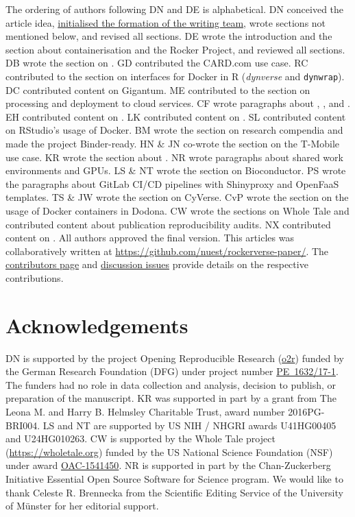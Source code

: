 The ordering of authors following DN and DE is alphabetical. DN
conceived the article idea,
\href{https://github.com/nuest/rockerverse-paper/issues/3}{initialised the formation of the writing team},
wrote sections not mentioned below, and revised all sections. DE wrote
the introduction and the section about containerisation and the Rocker
Project, and reviewed all sections. DB wrote the section on
. GD contributed the CARD.com use case. RC contributed to
the section on interfaces for Docker in R (\emph{dynverse} and
\texttt{dynwrap}). DC contributed content on Gigantum. ME contributed to
the section on processing and deployment to cloud services. CF wrote
paragraphs about , ,  and
. EH contributed content on . LK contributed
content on . SL contributed content on RStudio's usage of
Docker. BM wrote the section on research compendia and made the project
Binder-ready. HN \& JN co-wrote the section on the T-Mobile use case. KR
wrote the section about . NR wrote paragraphs about
shared work environments and GPUs. LS \& NT wrote the section on
Bioconductor. PS wrote the paragraphs about GitLab CI/CD pipelines with
Shinyproxy and OpenFaaS templates. TS \& JW wrote the section on
CyVerse. CvP wrote the section on the usage of Docker containers in
Dodona. CW wrote the sections on Whole Tale and contributed content
about publication reproducibility audits. NX contributed content on
. All authors approved the final version. This articles was
collaboratively written at
\href{https://github.com/nuest/rockerverse-paper/}{https://github.com/nuest/rockerverse-paper/}.
The
\href{https://github.com/nuest/rockerverse-paper/graphs/contributors}{contributors page}
and
\href{https://github.com/nuest/rockerverse-paper/issues/}{discussion issues}
provide details on the respective contributions.

\hypertarget{acknowledgements}{%
\section{Acknowledgements}\label{acknowledgements}}

DN is supported by the project Opening Reproducible Research
(\href{https://www.uni-muenster.de/forschungaz/project/12343}{o2r})
funded by the German Research Foundation (DFG) under project number
\href{https://gepris.dfg.de/gepris/projekt/415851837}{PE~1632/17-1}. The
funders had no role in data collection and analysis, decision to
publish, or preparation of the manuscript. KR was supported in part by a
grant from The Leona M. and Harry B. Helmsley Charitable Trust, award
number 2016PG-BRI004. LS and NT are supported by US NIH / NHGRI awards
U41HG00405 and U24HG010263. CW is supported by the Whole Tale project
(\url{https://wholetale.org}) funded by the US National Science
Foundation (NSF) under award
\href{https://www.nsf.gov/awardsearch/showAward?AWD_ID=1541450}{OAC-1541450}.
NR is supported in part by the Chan-Zuckerberg Initiative Essential Open
Source Software for Science program. We would like to thank Celeste R.
Brennecka from the Scientific Editing Service of the University of
Münster for her editorial support.

